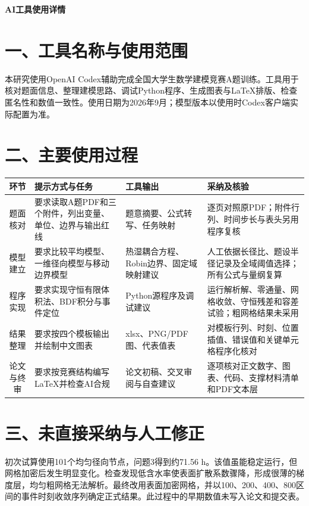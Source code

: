 \documentclass[zihao=-4,UTF8]{ctexart}
\begin{document}
\begin{center}{\bfseries AI工具使用详情}\end{center}

\section*{一、工具名称与使用范围}
本研究使用OpenAI Codex辅助完成全国大学生数学建模竞赛A题训练。工具用于核对题面信息、整理建模思路、调试Python程序、生成图表与LaTeX排版、检查匿名性和数值一致性。使用日期为2026年9月；模型版本以使用时Codex客户端实际配置为准。

\section*{二、主要使用过程}
\begin{table}[htbp]\centering\footnotesize
\begin{tabularx}{\textwidth}{cYYY}
\toprule 环节 & 提示方式与任务 & 工具输出 & 采纳及核验 \\
\midrule 题面核对 & 要求读取A题PDF和三个附件，列出变量、单位、边界与输出红线 & 题意摘要、公式转写、任务映射 & 逐页对照原PDF；附件行列、时间步长与表头另用程序复核 \\
模型建立 & 要求比较平均模型、一维径向模型与移动边界模型 & 热湿耦合方程、Robin边界、固定域映射建议 & 人工依据长径比、题设半径记录及全域阈值选择；所有公式与量纲复算 \\
程序实现 & 要求实现守恒有限体积法、BDF积分与事件定位 & Python源程序及调试建议 & 运行解析解、零通量、网格收敛、守恒残差和容差试验；粗网格结果未采用 \\
结果整理 & 要求按四个模板输出并绘制中文图表 & xlsx、PNG/PDF图、代表值表 & 对模板行列、时刻、位置插值、错误值和关键单元格程序化核对 \\
论文与终审 & 要求按竞赛结构编写LaTeX并检查AI合规 & 论文初稿、交叉审阅与自查建议 & 逐项核对正文数字、图表、代码、支撑材料清单和PDF文本层 \\
\bottomrule
\end{tabularx}
\end{table}

\section*{三、未直接采纳与人工修正}
初次试算使用101个均匀径向节点，问题3得到约71.56 h。该值虽能稳定运行，但网格加密后发生明显变化。检查发现低含水率使表面扩散系数骤降，形成很薄的梯度层，均匀粗网格无法解析。最终改用表面加密网格，并以100、200、400、800区间的事件时刻收敛序列确定正式结果。此过程中的早期数值未写入论文和提交表。
\end{document}
